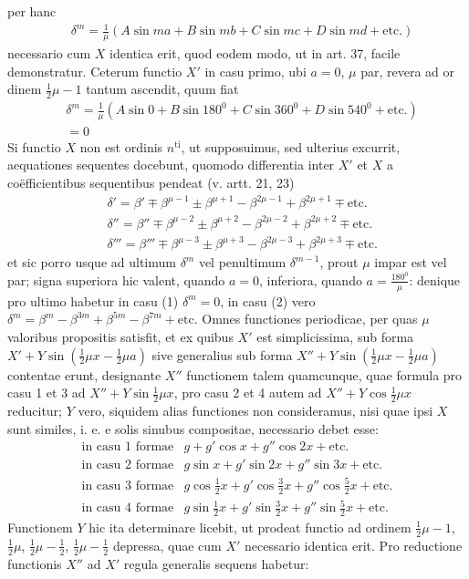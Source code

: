 per hanc
\[
\begin{aligned}
&\delta^m=\frac1\mu(A\sin ma+B\sin mb+C\sin mc+D\sin md+\text{etc.})
\end{aligned}
\]
necessario cum $X$ identica erit, quod eodem modo, ut in art. 37,
facile demonstratur. Ceterum functio $X'$ in casu primo, ubi $a=0$,
$\mu$ par, revera ad or%
dinem $\frac12\mu-1$ tantum ascendit, quum fiat
\[
\begin{aligned}
&\delta^m=\frac1\mu(A\sin 0+B\sin 180^0+C\sin 360^0+D\sin 540^0+\text{etc.})\\[6pt]
&=0
\end{aligned}
\]
Si functio $X$ non est ordinis $n^{\mathrm{ti}}$, ut supposuimus,
sed ulterius excurrit, aequationes sequentes docebunt, quomodo differentia
inter $X'$ et $X$ a coëfficientibus sequentibus pendeat (v. artt. 21, 23)
\[
\begin{aligned}
&\delta'=\beta'\mp\beta^{\mu-1}\pm\beta^{\mu+1}-\beta^{2\mu-1}+\beta^{2\mu+1}\mp\text{etc.}\\[6pt]
&\delta''=\beta''\mp\beta^{\mu-2}\pm\beta^{\mu+2}-\beta^{2\mu-2}+\beta^{2\mu+2}\mp\text{etc.}\\[6pt]
&\delta'''=\beta'''\mp\beta^{\mu-3}\pm\beta^{\mu+3}-\beta^{2\mu-3}+\beta^{2\mu+3}\mp\text{etc.}
\end{aligned}
\]
et sic porro usque ad ultimum $\delta^m$ vel penultimum $\delta^{m-1}$,
prout $\mu$ impar est vel par; signa superiora hic valent, quando $a=0$,
inferiora, quando $a=\frac{180^0}{\mu}$: denique pro ultimo habetur
in casu (1) $\delta^m=0$, in casu (2) vero
$\delta^m=\beta^m-\beta^{3m}+\beta^{5m}-\beta^{7m}+\text{etc.}$
Omnes functiones periodicae, per quas $\mu$ valoribus propositis satisfit,
et ex quibus $X'$ est simplicissima, sub forma
$X'+Y\sin(\frac12\mu x-\frac12\mu a)$ sive generalius sub forma
$X''+Y\sin(\frac12\mu x-\frac12\mu a)$ contentae erunt, designante
$X''$ functionem talem quamcunque, quae formula pro casu 1 et 3 ad
$X''+Y\sin\frac12\mu x$, pro casu 2 et 4 autem ad
$X''+Y\cos\frac12\mu x$ reducitur; $Y$ vero, siquidem alias functiones
non consideramus, nisi quae ipsi $X$ sunt similes, i. e. e solis sinubus
compositae, necessario debet esse:
\[
\begin{array}{ll}
\text{in casu 1 formae}&g+g'\cos x+g''\cos 2x+\text{etc.}\\
\text{in casu 2 formae}&g\sin x+g'\sin 2x+g''\sin 3x+\text{etc.}\\
\text{in casu 3 formae}&g\cos\frac12x+g'\cos\frac32x+g''\cos\frac52x+\text{etc.}\\
\text{in casu 4 formae}&g\sin\frac12x+g'\sin\frac32x+g''\sin\frac52x+\text{etc.}
\end{array}
\]
Functionem $Y$ hic ita determinare licebit, ut prodeat functio ad ordinem
$\frac12\mu-1$, $\frac12\mu$, $\frac12\mu-\frac12$,
$\frac12\mu-\frac12$ depressa, quae cum $X'$ necessario identica erit.
Pro reductione functionis $X''$ ad $X'$ regula generalis sequens habetur:

